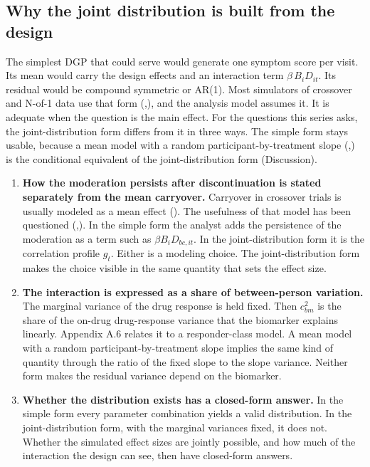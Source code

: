 \documentclass[
  11pt,
]{article}
\providecommand{\tightlist}{%
  \setlength{\itemsep}{0pt}\setlength{\parskip}{0pt}}
\begin{document}
\subsection{Why the joint distribution is built from the design}\label{why-the-joint-distribution-is-built-from-the-design}

The simplest DGP that could serve would generate one symptom score per
visit. Its mean would carry the design effects and an interaction term
\(\beta\, B_i D_{it}\). Its residual would be compound symmetric or
AR(1). Most simulators of crossover and N-of-1 data use that form
(,), and the analysis model
assumes it. It is adequate when the question is the main effect. For
the questions this series asks, the joint-distribution form differs
from it in three ways. The simple form stays usable, because a mean
model with a random participant-by-treatment slope
(,) is the conditional equivalent of the
joint-distribution form (Discussion).

\begin{enumerate}
\def\labelenumi{\arabic{enumi}.}
\tightlist
\item
  \textbf{How the moderation persists after discontinuation is stated
  separately from the mean carryover.} Carryover in crossover trials
  is usually modeled as a mean effect (). The
  usefulness of that model has been questioned (,). In the simple form the analyst adds the
  persistence of the moderation as a term such as
  \(\beta B_i D_{bc,it}\). In the
  joint-distribution form it is the correlation profile \(g_t\). Either
  is a modeling choice. The joint-distribution form makes the choice
  visible in the same quantity that sets the effect size.
\item
  \textbf{The interaction is expressed as a share of between-person
  variation.} The marginal variance of the drug response is held
  fixed. Then \(c_{bm}^2\) is the share of the on-drug drug-response
  variance that the biomarker explains linearly. Appendix A.6 relates
  it to a responder-class model. A mean model with a random
  participant-by-treatment slope implies the same kind of quantity
  through the ratio of the fixed slope to the slope variance. Neither
  form makes the residual variance depend on the biomarker.
\item
  \textbf{Whether the distribution exists has a closed-form answer.} In
  the simple form every parameter combination yields a valid
  distribution. In the
  joint-distribution form, with the marginal variances fixed, it does
  not. Whether the simulated effect sizes are jointly possible, and
  how much of the interaction the design can see, then have
  closed-form answers.
\end{enumerate}
\end{document}
